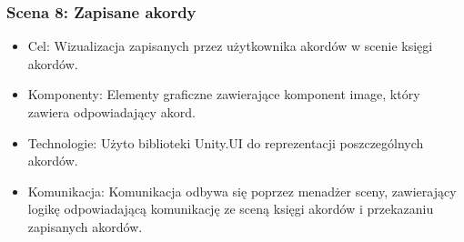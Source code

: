 \subsubsection{Scena 8: Zapisane akordy}

\begin{itemize}
	\item Cel: Wizualizacja zapisanych przez użytkownika akordów w scenie księgi akordów.
	\item Komponenty: Elementy graficzne zawierające komponent image, który zawiera odpowiadający akord.
	\item Technologie: Użyto biblioteki Unity.UI do reprezentacji poszczególnych akordów.
	\item Komunikacja: Komunikacja odbywa się poprzez menadżer sceny, zawierający logikę odpowiadającą komunikację ze sceną księgi akordów i przekazaniu zapisanych akordów.
\end{itemize}